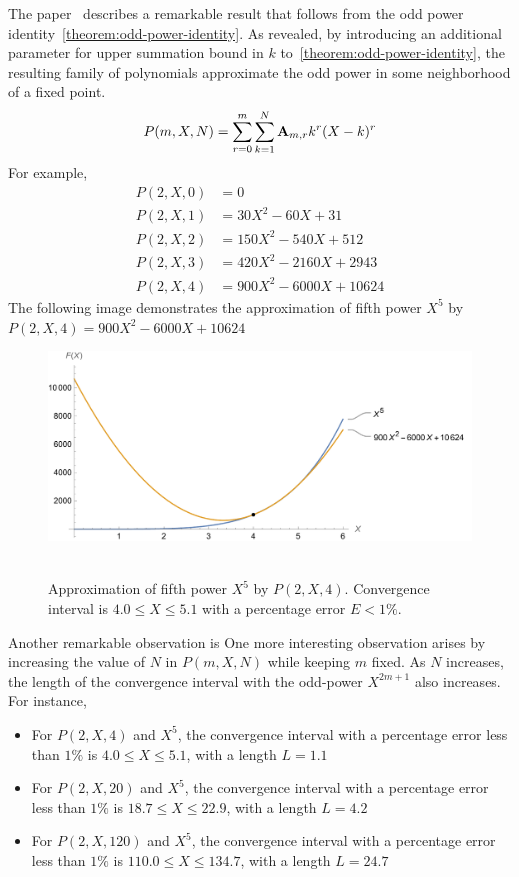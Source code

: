 The paper~\cite{kolosov2025efficient} describes a remarkable result that follows
from the odd power identity~\eqref{theorem:odd-power-identity}.
As revealed, by introducing an additional parameter for upper summation bound in $k$
to~\eqref{theorem:odd-power-identity}, the resulting family of polynomials
approximate the odd power in some neighborhood of a fixed point.
\begin{align*}
    P(m,X,N) = \sum_{r=0}^{m} \sum_{k=1}^{N} {\mathbf{A}} \sb{m,r} k^r (X-k)^r
\end{align*}
For example,
\begin{align*}
    P(2,X,0) &= 0 \\
    P(2,X,1) &= 30X^2 - 60X + 31 \\
    P(2,X,2) &= 150X^2 - 540X + 512 \\
    P(2,X,3) &= 420X^2 - 2160X + 2943 \\
    P(2,X,4) &= 900X^2 - 6000X + 10624
\end{align*}
The following image demonstrates the approximation of fifth power $X^5$ by
$P(2,X,4) = 900X^2 - 6000X + 10624$
\begin{figure}[H]
    \centering
    \includegraphics[width=1\textwidth]{sections/images/03_plots_polynomial_p2_n4_with_fifth}
    ~\caption{Approximation of fifth power $X^5$ by $P(2, X, 4)$.
    Convergence interval is $4.0 \leq X \leq 5.1$ with a percentage error $E < 1\%$.
    }\label{fig:03_plots_polynomial_p2_n4_with_fifth}
\end{figure}
Another remarkable observation is
One more interesting observation arises by increasing the value of $N$ in $P(m, X, N)$ while keeping $m$ fixed.
As $N$ increases, the length of the convergence interval with the odd-power $X^{2m+1}$ also increases.
For instance,
\begin{itemize}
    \item For $P(2, X, 4)$ and $X^5$, the convergence interval with a percentage error less than $1\%$ is $4.0 \leq X \leq 5.1$, with a length $L=1.1$
    \item For $P(2, X, 20)$ and $X^5$, the convergence interval with a percentage error less than $1\%$ is $18.7 \leq X \leq 22.9$, with a length $L=4.2$
    \item For $P(2, X, 120)$ and $X^5$, the convergence interval with a percentage error less than $1\%$ is $110.0 \leq X \leq 134.7$, with a length $L=24.7$
\end{itemize}
